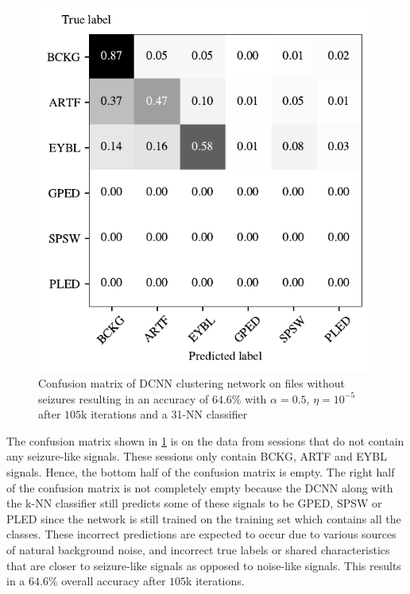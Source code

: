 \begin{figure}[!ht]
	\centering
	\includegraphics[width=0.7\linewidth]{pictures/conf_mat_exp_without_seizure.pdf}
	\caption[Confusion Matrix on Sessions without Seizure-Like Signals]{Confusion matrix of DCNN clustering network on files without seizures resulting in an accuracy of $64.6\%$ with $\alpha = 0.5$, $\eta = 10^{-5}$ after $105$k iterations and a 31-NN classifier}\label{fig:conf_mat_exp_without_seizure}  
\end{figure}

The confusion matrix shown in \cref{fig:conf_mat_exp_without_seizure} is on the data from sessions that do not contain any seizure-like signals. These sessions only contain BCKG, ARTF and EYBL signals. Hence, the bottom half of the confusion matrix is empty. The right half of the confusion matrix is not completely empty because the DCNN along with the k-NN classifier still predicts some of these signals to be GPED, SPSW or PLED since the network is still trained on the training set which contains all the classes. These incorrect predictions are expected to occur due to various sources of natural background noise, and incorrect true labels or shared characteristics that are closer to seizure-like signals as opposed to noise-like signals. This results in a $64.6\%$ overall accuracy after $105$k iterations.

